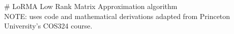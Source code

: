 # LoRMA
Low Rank Matrix Approximation algorithm\\
NOTE: uses code and mathematical derivations adapted from Princeton University's COS324 course.
